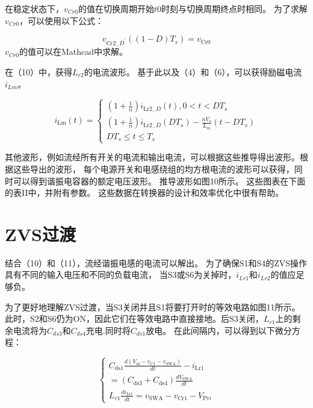 \documentclass[12pt,a4paper]{report}
\begin{document}
在稳定状态下，$v_{Cr0}$的值在切换周期开始$t0$时刻与切换周期终点时相同。 为了求解$v_{Cr0}$，可以使用以下公式：

\begin{equation}
    v_{\mathrm{Cr} 2_{-} D^{\prime}}\left((1-D) T_{s}\right)=v_{\mathrm{Cr} 0}
\end{equation}
$v_{Cr0}$的值可以在Mathcad中求解。

在（10）中，获得$L_{r2}$的电流波形。 基于此以及（4）和（6），可以获得励磁电流$i_{Lm}$。

\begin{equation}
    i_{\mathrm{Lm}}(t)=\left\{\begin{array}{c}
        \left(1+\frac{1}{n}\right) i_{\mathrm{Lr} 2_{-} D}(t), 0<t<D T_{s}                                                 \\
        \left(1+\frac{1}{n}\right) i_{\mathrm{Lr} 2_{-} D}\left(D T_{s}\right)-\frac{n V_{o}}{L_{m}}\left(t-D T_{s}\right) \\
        D T_{s} \leq t \leq T_{s}
    \end{array}\right.
\end{equation}

其他波形，例如流经所有开关的电流和输出电流，可以根据这些推导得出波形。根据这些导出的波形，
每个电源开关和电感绕组的均方根电流的波形可以获得，同时可以得到谐振电容器的额定电压波形。 推导波形如图10所示。
这些图表在下面的表II中，并附有参数。 这些数据在转换器的设计和效率优化中很有帮助。

\section{ZVS过渡}

结合（10）和（11），流经谐振电感的电流可以解出。
为了确保S1和S4的ZVS操作具有不同的输入电压和不同的负载电流，
当S3或S6为关掉时，$i_{Lr1}$和$i_{Lr2}$的值应足够负。

为了更好地理解ZVS过渡，当S3关闭并且S1将要打开时的等效电路如图11所示。
此时，S2和S6仍为ON，因此它们在等效电路中直接接地。后S3关闭，$L_{r1}$上的剩余电流将为$C_{ds3}$和$C_{ds4}$充电.同时将$C_{ds1}$放电。
在此间隔内，可以得到以下微分方程：

\begin{equation}
    \left\{\begin{array}{c}
        C_{\mathrm{ds} 1} \frac{d\left(V_{\mathrm{in}}-v_{C 1}-v_{\mathrm{SWA}}\right)}{d t}-i_{\mathrm{Lr} 1} \\
        =\left(C_{\mathrm{ds} 3}+C_{\mathrm{ds} 4}\right) \frac{d V_{\mathrm{SWA}}}{d t}                       \\
        L_{r 1} \frac{d i_{\mathrm{Lr} 1}}{d t}=v_{\mathrm{SWA}}-v_{\mathrm{Cr} 1}-V_{\mathrm{Pr} i}
    \end{array}\right.
\end{equation}
\end{document}
